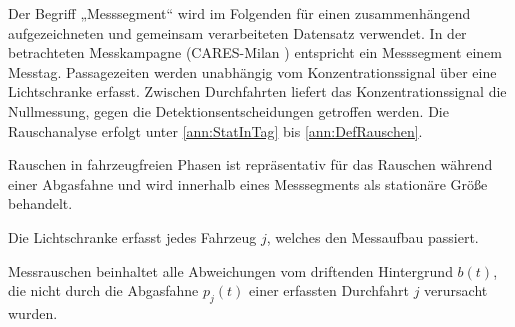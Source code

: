 \noindent
Der Begriff „Messsegment“ wird im Folgenden für einen zusammenhängend aufgezeichneten und gemeinsam verarbeiteten Datensatz verwendet. In der betrachteten Messkampagne (CARES-Milan \cite{knollLargescaleAutomatedEmission2024}) entspricht ein Messsegment einem Messtag. Passagezeiten werden unabhängig vom Konzentrationssignal über eine Lichtschranke erfasst. Zwischen Durchfahrten liefert das Konzentrationssignal die Nullmessung, gegen die Detektionsentscheidungen getroffen werden.
Die Rauschanalyse erfolgt unter \autoref{ann:StatInTag} bis \autoref{ann:DefRauschen}.
\begin{annahme}\label{ann:StatInTag}
Rauschen in fahrzeugfreien Phasen ist repräsentativ für das Rauschen während einer Abgasfahne und wird innerhalb eines Messsegments als stationäre Größe behandelt.
\end{annahme}
\begin{annahme}\label{ann:VollstMaskierung}
Die Lichtschranke erfasst jedes Fahrzeug $j$, welches den Messaufbau passiert.
\end{annahme}
\begin{annahme}\label{ann:DefRauschen}
Messrauschen beinhaltet alle Abweichungen vom driftenden Hintergrund $b(t)$, die nicht durch die Abgasfahne $p_j(t)$ einer erfassten Durchfahrt $j$ verursacht wurden. 
\end{annahme}


